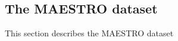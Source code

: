 \documentclass[../../sections/dataset.tex]{subfiles}
\begin{document}
\subsection{The MAESTRO dataset}
    This section describes the MAESTRO dataset
\end{document}
